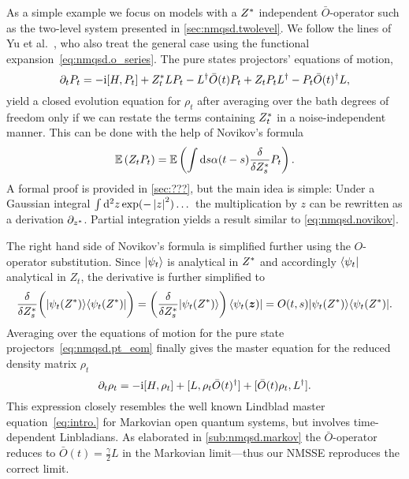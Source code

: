 As a simple example we focus on models with a ${Z}^*$ independent $\bar O$-operator such as the two-level system presented in \autoref{sec:nmqsd.twolevel}.
We follow the lines of Yu et al.~\cite{YuDiGiSt99_pertubation,YuDiGi00_master}, who also treat the general case using the functional expansion~\ref{eq:nmqsd.o_series}.
The pure states projectors' equations of motion,
\begin{equation}
  \partial_t P_t = -\mathrm{i} [H, P_t] + {Z}^*_t L P_t - L^\dagger\bar O(t)P_t + Z_t P_t L^\dagger - P_t \bar O(t)^\dagger L,
  \label{eq:nmqsd.pt_eom}
\end{equation}
yield a closed evolution equation for $\rho_t$ after averaging over the bath degrees of freedom only if we can restate the terms containing ${Z}^*_t$ in a noise-independent manner.
This can be done with the help of Novikov's formula \cite{No65_functionals}
\begin{equation}
  \E[Z_t P_t] = \E[\intdd s \alpha(t - s) \frac{\delta}{\delta \ZZ_s} P_t].
  \label{eq:nmqsd.novikov}
\end{equation}
A formal proof is provided in \autoref{sec:???}, but the main idea is simple:
Under a Gaussian integral $\intdd^2 z \, \exp(-\abs{z}^2) \dots$ the multiplication by $z$ can be rewritten as a derivation $\partial_{{z}^*}$.
Partial integration yields a result similar to \autoref{eq:nmqsd.novikov}.

The right hand side of Novikov's formula is simplified further using the $O$-operator substitution.
Since $| \psi_t \rangle$ is analytical in ${Z}^*$ and accordingly $\langle \psi_t |$ analytical in $Z_t$, the derivative is further simplified to
\begin{equation*}
  \frac{\delta}{\delta {Z}^*_s} \bigg( | \psi_t({Z}^*) \rangle\langle \psi_t({Z}^*) | \bigg) = \left( \frac{\delta}{\delta {Z}^*_s} | \psi_t({Z}^*) \rangle \right)\langle \psi_t(\boldsymbol{z}) | = O(t, s) | \psi_t({Z}^*) \rangle\langle \psi_t({Z}^*) |.
\end{equation*}
Averaging over the equations of motion for the pure state projectors~\ref{eq:nmqsd.pt_eom} finally gives the master equation for the reduced density matrix $\rho_t$
\begin{equation}
  \partial_t \rho_t = -\mathrm{i} [H, \rho_t]  +  [L, \rho_t \bar O(t)^\dagger]  +  [\bar O(t) \rho_t, L^\dagger].
  \label{eq:nmqsd.master}
\end{equation}
This expression closely resembles the well known Lindblad master equation~\ref{eq:intro.} for Markovian open quantum systems, but involves time-dependent Linbladians.
As elaborated in \autoref{sub:nmqsd.markov} the $\bar O$-operator reduces to $\bar O(t) = \frac{\gamma}{2} L$ in the Markovian limit---thus our NMSSE reproduces the correct limit.


